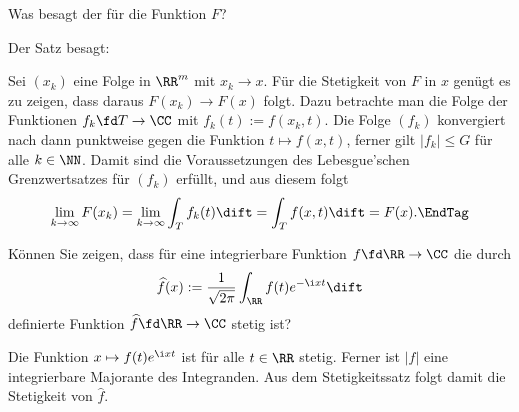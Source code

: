 \begin{frage}\label{11_paramstetigkeit}
  Was besagt der  für die Funktion $F$? 
\end{frage}

\begin{antwort}
  Der Satz besagt: 

  \medskip\noindent
  Sei $(x_k)$ eine Folge in $\RR^m$ mit $x_k \to x$. Für die Stetigkeit 
  von $F$ in $x$ genügt es zu zeigen, dass daraus $F(x_k) \to F(x)$ folgt. 
  Dazu betrachte man die Folge der Funktionen $f_k \fd T \to \CC$ 
  mit $f_k(t) := f(x_k,t)$. 
  Die Folge $(f_k)$ konvergiert nach  dann punktweise 
  gegen die Funktion $t\mapsto f(x,t)$, ferner gilt $|f_k| \le G$ für 
  alle $k\in\NN$. Damit sind die Voraussetzungen 
  des Lebesgue'schen Grenzwertsatzes für $(f_k)$ erfüllt, und aus diesem 
  folgt
  \[
  \lim_{k\to\infty} F(x_k)=
  \lim_{k\to\infty} \int_T f_k(t)\dift=
  \int_T f(x,t)\dift = F(x).\EndTag
  \]
\end{antwort}

\begin{frage}
  Können Sie zeigen, dass für eine integrierbare Funktion 
  $f\fd \RR\to\CC$ die durch 
  \[
  \widehat{f}(x) := \frac{1}{\sqrt{2\pi}} \int_\RR f(t)e^{-\i xt} \dift 
  \]
  definierte Funktion $\widehat{f}\fd \RR\to\CC$ stetig ist?
\end{frage}

\begin{antwort}
  Die Funktion $x\mapsto f(t)e^{\i xt}$ ist für alle $t\in\RR$ stetig. 
  Ferner ist $|f|$ eine integrierbare Majorante des Integranden. Aus dem 
  Stetigkeitssatz folgt damit die Stetigkeit von $\widehat{f}$. 
  \AntEnd
\end{antwort}

